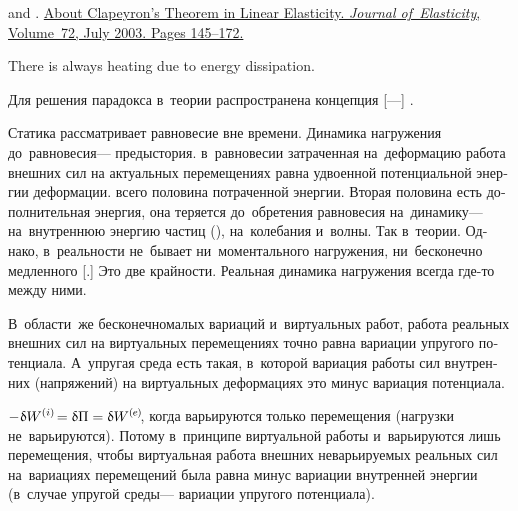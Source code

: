 \begin{otherlanguage}{russian}
{

 and .
\href{http://www.cityu.edu.hk/ma/ws2007/notes/FTJElast.pdf}{About Clapeyron’s Theorem in Linear Elasticity. \emph{Journal of~Elasticity}, Volume~72, July 2003. Pages 145\hbox{--}172.}
\par}

There is always heating due to energy dissipation.

Для решения парадокса в~теории распространена концепция [---]   .

{\small
Статика рассматривает  равновесие вне времени.
Динамика нагружения до~равновесия\:--- предыстория.
 в~равновесии затраченная на~деформацию работа внешних сил на актуальных перемещениях равна удвоенной потенциальной энергии деформации.
 всего половина потраченной энергии.
Вторая половина есть дополнительная энергия, она теряется до~обретения равновесия на~динамику\:--- на~внутреннюю энергию частиц (), на~колебания и~волны.
Так в~теории.
Однако, в~реальности не~бывает ни~моментального  нагружения, ни~бесконечно медленного [.]
Это две крайности.
Реальная динамика нагружения всегда где\hbox{-}то между ними.

В~области~же бесконечномалых вариаций и~виртуальных работ, работа реальных внешних сил на виртуальных перемещениях точно равна вариации упругого потенциала.
А~упругая среда есть такая, в~которой вариация работы сил внутренних (напряжений) на виртуальных деформациях это минус вариация потенциала.

${- \hspace{.1ex} \variation{\internalwork} \hspace{-0.2ex} = \variation{\potential} = \variation{\externalwork} \hspace{-0.25ex}}$, когда варьируются только перемещения (нагрузки не~варьируются).
Потому в~принципе виртуальной работы и~варьируются лишь перемещения, чтобы виртуальная работа внешних неварьируемых реальных сил на~вариациях перемещений была равна минус вариации внутренней энергии (в~случае упругой среды\:--- вариации упругого потенциала).
\par}


\end{otherlanguage}
